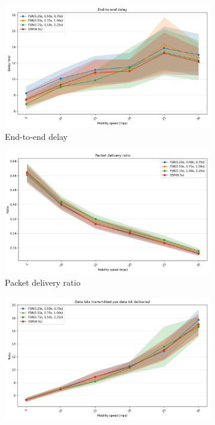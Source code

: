 \documentclass{winslabreport}
\begin{document}
\begin{figure}
    \centering
    \begin{subfigure}[b]{0.45\textwidth}
        \includegraphics[width=\textwidth]{../figures/speed/end-to-end_delay.png}
        \caption{End-to-end delay}
        \label{fig:delay_speed}
    \end{subfigure}
    \hfill
    \begin{subfigure}[b]{0.45\textwidth}
        \includegraphics[width=\textwidth]{../figures/speed/packet_delivery_ratio.png}
        \caption{Packet delivery ratio}
        \label{fig:delivery_speed}
    \end{subfigure}
    \begin{subfigure}[b]{0.45\textwidth}
        \includegraphics[width=\textwidth]{../figures/speed/data_bits_transmitted_per_data_bit_delivered.png}

\end{subfigure}
\end{figure}
\end{document}

